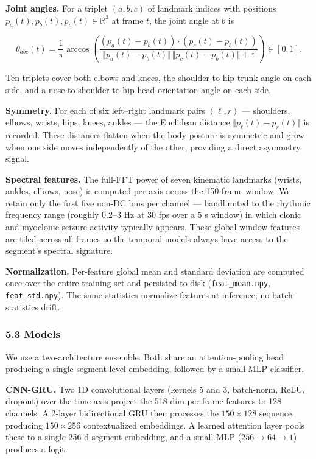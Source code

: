 \documentclass[
  11pt,
]{article}
\begin{document}
\textbf{Joint angles.} For a triplet \((a, b, c)\) of landmark indices
with positions \(p_a(t), p_b(t), p_c(t) \in \mathbb{R}^3\) at frame
\(t\), the joint angle at \(b\) is

\[\theta_{abc}(t) = \frac{1}{\pi}\arccos\!\left(\frac{(p_a(t)-p_b(t)) \cdot (p_c(t)-p_b(t))}{\Vert p_a(t)-p_b(t)\Vert\, \Vert p_c(t)-p_b(t)\Vert + \varepsilon}\right) \in [0, 1].\]

Ten triplets cover both elbows and knees, the shoulder-to-hip trunk
angle on each side, and a nose-to-shoulder-to-hip head-orientation angle
on each side.

\textbf{Symmetry.} For each of six left--right landmark pairs
\((\ell, r)\) --- shoulders, elbows, wrists, hips, knees, ankles --- the
Euclidean distance \(\Vert p_\ell(t) - p_r(t) \Vert\) is recorded. These
distances flatten when the body posture is symmetric and grow when one
side moves independently of the other, providing a direct asymmetry
signal.

\textbf{Spectral features.} The full-FFT power of seven kinematic
landmarks (wrists, ankles, elbows, nose) is computed per axis across the
150-frame window. We retain only the first five non-DC bins per channel
--- bandlimited to the rhythmic frequency range (roughly 0.2--3 Hz at 30
fps over a 5 s window) in which clonic and myoclonic seizure activity
typically appears. These global-window features are tiled across all
frames so the temporal models always have access to the segment's
spectral signature.

\textbf{Normalization.} Per-feature global mean and standard deviation
are computed once over the entire training set and persisted to disk
(\texttt{feat\_mean.npy}, \texttt{feat\_std.npy}). The same statistics
normalize features at inference; no batch-statistics drift.

\subsubsection{5.3 Models}\label{models}

We use a two-architecture ensemble. Both share an attention-pooling head
producing a single segment-level embedding, followed by a small MLP
classifier.

\textbf{CNN-GRU.} Two 1D convolutional layers (kernels 5 and 3,
batch-norm, ReLU, dropout) over the time axis project the 518-dim
per-frame features to 128 channels. A 2-layer bidirectional GRU then
processes the \(150 \times 128\) sequence, producing \(150 \times 256\)
contextualized embeddings. A learned attention layer pools these to a
single 256-d segment embedding, and a small MLP (\(256 \to 64 \to 1\))
produces a logit.
\end{document}
